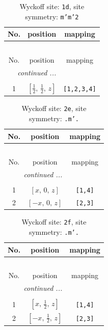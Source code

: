 \documentclass[fleqn,8pt]{jsarticle}
\begin{document}
\renewcommand{\arraystretch}{1.2}
\begin{longtable}{ccc}
\caption{Wyckoff site: {\tt 1d}, site symmetry: {\tt m'm'2}}
 \\
 \hline \hline
No. & position & mapping \\ \hline \endfirsthead

\multicolumn{2}{l}{\tablename\ \thetable{}} \\
 \hline \hline
No. & position & mapping \\ \hline \endhead

 \hline \hline
\multicolumn{2}{r}{\footnotesize\it continued ...} \\ \endfoot

 \hline \hline
\multicolumn{2}{r}{} \\ \endlastfoot

1 & $\left[ \frac{1}{2},\, \frac{1}{2},\, z \right]$ & {\tt [1,2,3,4]} \\
\end{longtable}
\renewcommand{\arraystretch}{1.2}
\begin{longtable}{ccc}
\caption{Wyckoff site: {\tt 2e}, site symmetry: {\tt .m'.}}
 \\
 \hline \hline
No. & position & mapping \\ \hline \endfirsthead

\multicolumn{2}{l}{\tablename\ \thetable{}} \\
 \hline \hline
No. & position & mapping \\ \hline \endhead

 \hline \hline
\multicolumn{2}{r}{\footnotesize\it continued ...} \\ \endfoot

 \hline \hline
\multicolumn{2}{r}{} \\ \endlastfoot

1 & $\left[ x,\, 0,\, z \right]$ & {\tt [1,4]} \\ \hline
2 & $\left[ - x,\, 0,\, z \right]$ & {\tt [2,3]} \\
\end{longtable}
\renewcommand{\arraystretch}{1.2}
\begin{longtable}{ccc}
\caption{Wyckoff site: {\tt 2f}, site symmetry: {\tt .m'.}}
 \\
 \hline \hline
No. & position & mapping \\ \hline \endfirsthead

\multicolumn{2}{l}{\tablename\ \thetable{}} \\
 \hline \hline
No. & position & mapping \\ \hline \endhead

 \hline \hline
\multicolumn{2}{r}{\footnotesize\it continued ...} \\ \endfoot

 \hline \hline
\multicolumn{2}{r}{} \\ \endlastfoot

1 & $\left[ x,\, \frac{1}{2},\, z \right]$ & {\tt [1,4]} \\ \hline
2 & $\left[ - x,\, \frac{1}{2},\, z \right]$ & {\tt [2,3]} \\
\end{longtable}
\end{document}
